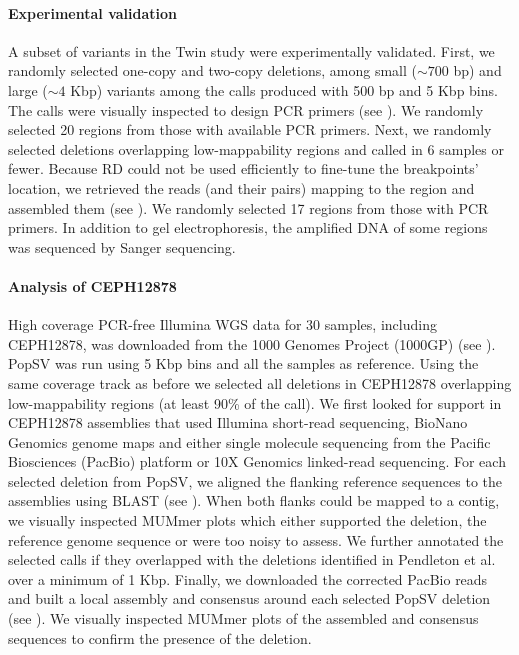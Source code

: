 \paragraph{Experimental validation}
A subset of variants in the Twin study were experimentally validated.
First, we randomly selected one-copy and two-copy deletions, among small ($\sim700$ bp) and large ($\sim4$ Kbp) variants among the calls produced with 500 bp and 5 Kbp bins.
The calls were visually inspected to design PCR primers (see ).
We randomly selected 20 regions from those with available PCR primers.
Next, we randomly selected deletions overlapping low-mappability regions and called in 6 samples or fewer.
Because RD could not be used efficiently to fine-tune the breakpoints' location, we retrieved the reads (and their pairs) mapping to the region and assembled them (see ).
We randomly selected 17 regions from those with PCR primers.
In addition to gel electrophoresis, the amplified DNA of some regions was sequenced by Sanger sequencing.

\paragraph{Analysis of CEPH12878}
High coverage PCR-free Illumina WGS data for 30 samples, including CEPH12878, was downloaded from the 1000 Genomes Project (1000GP)\cite{Sudmant2015a} (see ).
{\sf PopSV} was run using 5 Kbp bins and all the samples as reference.
Using the same coverage track as before we selected all deletions in CEPH12878 overlapping low-mappability regions (at least 90\% of the call).
We first looked for support in CEPH12878 assemblies that used Illumina short-read sequencing, BioNano Genomics genome maps and either single molecule sequencing from the Pacific Biosciences (PacBio) platform\cite{Pendleton2015} or 10X Genomics linked-read sequencing\cite{Mostovoy2016}.
For each selected deletion from {\sf PopSV}, we aligned the flanking reference sequences to the assemblies using {\sf BLAST}\cite{Camacho2009} (see ).
When both flanks could be mapped to a contig, we visually inspected MUMmer plots\cite{Kurtz2004} which either supported the deletion, the reference genome sequence or were too noisy to assess.
We further annotated the selected calls if they overlapped with the deletions identified in Pendleton et al.\cite{Pendleton2015} over a minimum of 1 Kbp.
Finally, we downloaded the corrected PacBio reads and built a local assembly and consensus around each selected {\sf PopSV} deletion (see ).
We visually inspected MUMmer plots of the assembled and consensus sequences to confirm the presence of the deletion.

